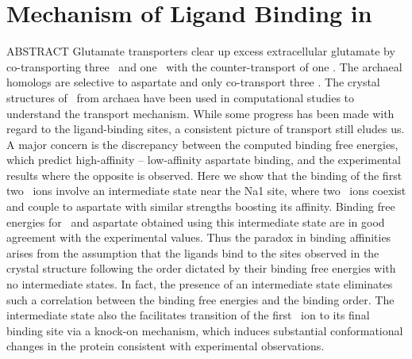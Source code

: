 \chapter{Mechanism of Ligand Binding in \GltPh}
\label{chap:bind}

ABSTRACT \newline
Glutamate transporters clear up excess extracellular glutamate by co-transporting three \Na\ and one 
\Hi\ with the counter-transport of one \K. The archaeal homologs are selective to aspartate and only 
co-transport three \Na. The crystal structures of \GltPh\ from archaea have been used in 
computational studies to understand the transport mechanism. While some progress has been made with 
regard to the ligand-binding sites, a consistent picture of transport still eludes us. A major 
concern is the discrepancy between the computed binding free energies, which predict high-affinity 
\Na-- low-affinity aspartate binding, and the experimental results where the opposite is observed. 
Here we show that the binding of the first two \Na\ ions involve an intermediate state near the Na1 
site, where two \Na\ ions coexist and couple to aspartate with similar strengths boosting its 
affinity. Binding free energies for \Na\ and aspartate obtained using this intermediate state are in 
good agreement with the experimental values. Thus the paradox in binding affinities arises from the 
assumption that the ligands bind to the sites observed in the crystal structure following the order 
dictated by their binding free energies with no intermediate states. In fact, the presence of an 
intermediate state eliminates such a correlation between the binding free energies and the binding 
order. The intermediate state also the facilitates transition of the first \Na\ ion to its final binding 
site via a knock-on mechanism, which induces substantial conformational changes in the protein 
consistent with experimental observations.

\newpage

